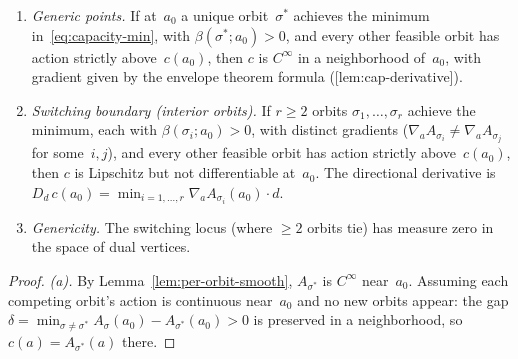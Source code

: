 \begin{unverified}
\begin{proposition}%
\label{prop:capacity-smoothness-classification}
\begin{enumerate}
\item[\textup{(a)}]
  \emph{Generic points.}
  If at~$a_0$ a unique orbit~$\sigma^*$ achieves the minimum
  in~\eqref{eq:capacity-min}, with $\beta(\sigma^*; a_0) > 0$,
  and every other feasible orbit has action strictly above~$c(a_0)$,
  then $c$ is $C^\infty$ in a neighborhood of~$a_0$,
  with gradient given by the envelope theorem formula
  (\textup{[lem:cap-derivative]}).

\item[\textup{(b)}]
  \emph{Switching boundary (interior orbits).}
  If $r \geq 2$ orbits $\sigma_1, \ldots, \sigma_r$ achieve the
  minimum, each with $\beta(\sigma_i; a_0) > 0$,
  with distinct gradients
  ($\nabla_a A_{\sigma_i} \neq \nabla_a A_{\sigma_j}$
  for some~$i, j$),
  and every other feasible orbit has action strictly above~$c(a_0)$,
  then $c$ is Lipschitz but not differentiable at~$a_0$.
  The directional derivative is
  $D_d\, c(a_0) = \min_{i=1,\ldots,r} \nabla_a A_{\sigma_i}(a_0) \cdot d$.


\item[\textup{(c)}]
  \emph{Genericity.}
  The switching locus (where $\geq 2$ orbits tie)
  has measure zero in the space of dual vertices.
\end{enumerate}
\end{proposition}

\begin{proof}
\emph{(a).}
By Lemma~\ref{lem:per-orbit-smooth},
$A_{\sigma^*}$ is $C^\infty$ near~$a_0$.
Assuming each competing orbit's action is continuous near~$a_0$
and no new orbits appear:
the gap $\delta = \min_{\sigma \neq \sigma^*}
A_\sigma(a_0) - A_{\sigma^*}(a_0) > 0$ is preserved
in a neighborhood, so $c(a) = A_{\sigma^*}(a)$ there.


\end{proof}
\end{unverified}
